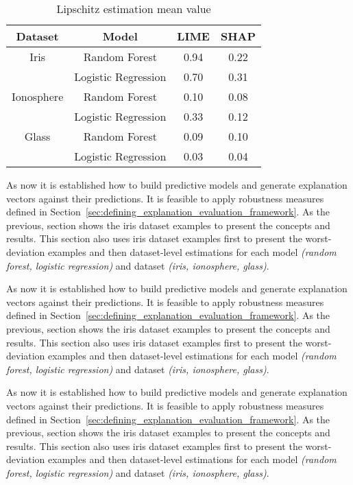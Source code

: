\documentclass[english]{tktltiki2}
\theoremstyle{definition}
\theoremstyle{remark}
\begin{document}
\begin{table}[H]
	\caption{Lipschitz estimation mean value}
	\label{table:lipschitz_estimation_aggregated_datasets_UCI}
	\begin{center}
		\begin{tabular}{|c|c|c|c|}
			\hline
			\textbf{Dataset} & \textbf{Model} & \textbf{LIME} & \textbf{SHAP} \\ \hline
			
			Iris & Random Forest & 0.94 & 0.22  \\ \hline
			& Logistic Regression & 0.70 & 0.31 \\ \hline
			
			Ionosphere & Random Forest & 0.10 & 0.08 \\ \hline
			& Logistic Regression & 0.33 & 0.12 \\ \hline
			
			Glass & Random Forest & 0.09 & 0.10 \\ \hline
			& Logistic Regression & 0.03 & 0.04 \\ \hline
			
		\end{tabular}
	\end{center}
\end{table}

As now it is established how to build predictive models and generate explanation vectors against their predictions. It is feasible to apply robustness measures defined in Section~\ref{sec:defining_explanation_evaluation_framework}. As the previous, section shows the iris dataset examples to present the concepts and results. This section also uses iris dataset examples first to present the worst-deviation examples and then dataset-level estimations for each model \textit{(random forest, logistic regression)} and dataset \textit{(iris, ionosphere, glass)}.

As now it is established how to build predictive models and generate explanation vectors against their predictions. It is feasible to apply robustness measures defined in Section~\ref{sec:defining_explanation_evaluation_framework}. As the previous, section shows the iris dataset examples to present the concepts and results. This section also uses iris dataset examples first to present the worst-deviation examples and then dataset-level estimations for each model \textit{(random forest, logistic regression)} and dataset \textit{(iris, ionosphere, glass)}.

As now it is established how to build predictive models and generate explanation vectors against their predictions. It is feasible to apply robustness measures defined in Section~\ref{sec:defining_explanation_evaluation_framework}. As the previous, section shows the iris dataset examples to present the concepts and results. This section also uses iris dataset examples first to present the worst-deviation examples and then dataset-level estimations for each model \textit{(random forest, logistic regression)} and dataset \textit{(iris, ionosphere, glass)}.
\end{document}
